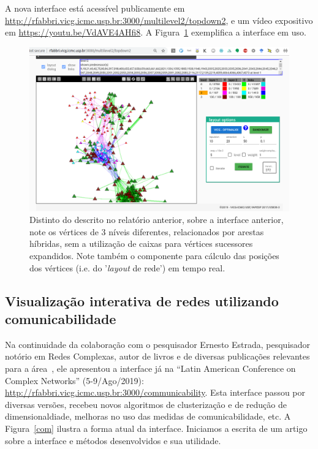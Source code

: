 \documentclass[a4paper, 11pt]{article}
\begin{document}
    A nova interface está acessível publicamente em \url{http://rfabbri.vicg.icmc.usp.br:3000/multilevel2/topdown2},
    e um vídeo expositivo em \url{https://youtu.be/VdAVE4AHfi8}.
    A Figura~\ref{ml} exemplifica a interface em uso.

\begin{figure}[h!]
\centering
  \includegraphics[width=0.8\linewidth]{hybrid}
\caption{%
  Distinto do descrito no relatório anterior, sobre a interface anterior,
  note os vértices de 3 níveis diferentes, relacionados por arestas
  híbridas, sem a utilização de caixas para vértices sucessores expandidos.
  Note também o componente para cálculo das posições dos vértices (i.e. do '\emph{layout} de rede') em tempo real.
}\label{ml}
\end{figure}

\subsection{Visualização interativa de redes utilizando comunicabilidade}\label{scom}
Na continuidade da colaboração com o pesquisador Ernesto Estrada,
pesquisador notório em Redes Complexas, autor de livros e de diversas publicações relevantes para a área~\cite{ern1,ern2,ern3,ern4},
ele apresentou a interface já na ``Latin American Conference on Complex Networks'' (5-9/Ago/2019):
\url{http://rfabbri.vicg.icmc.usp.br:3000/communicability}.
Esta interface passou por diversas versões,
recebeu novos algoritmos de clusterização e de redução de dimensionaldiade,
melhoras no uso das medidas de comunicabilidade, etc.
A Figura~\ref{com} ilustra a forma atual da interface.
Iniciamos a escrita de um artigo sobre a interface e métodos desenvolvidos
e sua utilidade.
\end{document}
